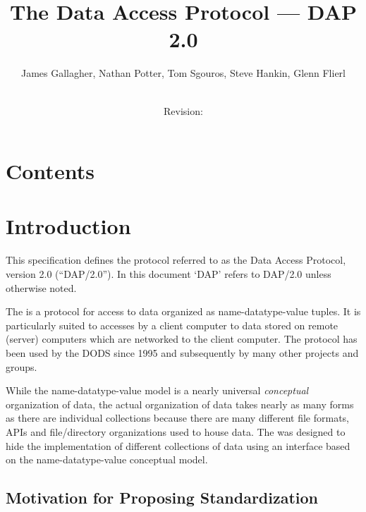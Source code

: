 \documentclass[justify]{nasa-ese}
\title{The Data Access Protocol --- DAP 2.0}
\author{James Gallagher, Nathan Potter, Tom Sgouros, Steve Hankin, Glenn Flierl}
\date{\rcsInfoDate \\ Revision: \rcsInfoRevision}
\begin{document}


\maketitle

\W\section{Contents}

\W{}
\T\tableofcontents

\section{Introduction}

This specification defines the protocol referred to as the Data Access
Protocol, version 2.0 (``DAP/2.0''). In this document `DAP' refers to DAP/2.0
unless otherwise noted.

The \DAP is a protocol for access to data organized as name-datatype-value
tuples. It is particularly suited to accesses by a client computer to data
stored on remote (server) computers which are networked to the client
computer. The protocol has been used by the \acl{DODS} since
1995\cite{gallagher:dods} and subsequently by many other projects and groups.

While the name-datatype-value model is a nearly universal
\emph{conceptual} organization of data, the actual organization of
data takes nearly as many forms as there are individual collections
because there are many different file formats, APIs and file/directory
organizations used to house data. The \DAP was designed to hide the
implementation of different collections of data using an interface
based on the name-datatype-value conceptual model.


\subsection{Motivation for Proposing Standardization}
\label{sec:motivation}
\end{document}
